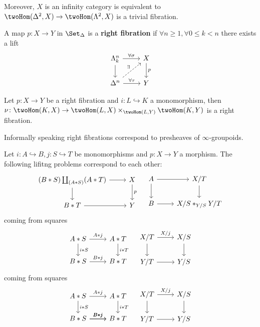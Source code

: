 Moreover, $ X $ is an infinity category is equivalent to $ \twoHom ( \Delta^2 , X ) \to \twoHom ( \Lambda^2 , X ) $ is a trivial fibration.


\begin{defi}
	A map $ p \colon X \to Y $ in $ \Set_\Delta$ is a \textbf{right fibration} if
	$ \forall n \geq 1 , \forall 0 \leq k < n $ there exists a lift
	\[
	\begin{tikzcd}
		\Lambda_k^n 
		\ar[r, " \forall \sigma "]
		\ar[d]
		&
		X
		\ar[d, "p"]
		\\
		\Delta^n
		\ar[ru, dashed, "\exists"]
		\ar[r, "\forall \tau"]
		&
		Y
	\end{tikzcd}
	\]
\end{defi}

\begin{prop}
	Let $ p \colon X \to Y $ be a right fibration and $ i \colon L \hookrightarrow K $ a monomorphism, then $ \nu \colon \twoHom ( K , X ) \to \twoHom ( L , X ) \times_{ \twoHom ( L , Y ) } \twoHom( K , Y ) $ is a right fibration.
\end{prop}

Informally speaking right fibrations correspond to presheaves of $ \infty $-groupoids.

\begin{prop}
	Let $ i \colon A \hookrightarrow B , j \colon S \hookrightarrow T $ be monomorphisms and $ p \colon X \to Y $ a morphism.
	The following lifitng problems correspond to each other:
	\[
	\begin{tikzcd}
		( B * S ) \coprod_{ ( A * S ) } ( A * T )
		\ar[r]
		\ar[d]
		&
		X
		\ar[d, "p "]
		\\
		B * T 
		\ar[r]
		&
		Y
	\end{tikzcd}
	\quad 
	\begin{tikzcd}
		A 
		\ar[r]
		\ar[d]
		&
		X / T
		\ar[d]
		\\
		B
		\ar[r]
		&
		X / S *_{ Y / S } Y / T
	\end{tikzcd}
	\]
	coming from squares 
	\[
	\begin{tikzcd}
		A * S 
		\ar[r, "A * j"]
		\ar[d, "i * S"]
		&
		A*T 
		\ar[d, "i * T"]
		\\
		B * S 
		\ar[r, " B * j "]
		&
		B*T
	\end{tikzcd}
	\quad 
	\begin{tikzcd}
		X / T 
		\ar[ r , " X / j " ]
		\ar[ d ]
		&
		X / S
		\ar[ d ]
		\\
		Y / T
		\ar[r]
		&
		Y / S
	\end{tikzcd}
	\]
	coming from squares
	\[
	\begin{tikzcd}
		A * S 
		\ar[r, " A * j "]
		\ar[d, " i * S "]
		&
		A*T
		\ar[d, " i * T "]
		\\
		B * S \ar[r, " B * j " ]
		\ar[r, " B * j "]
		&
		B * T
	\end{tikzcd}
	\quad
	\begin{tikzcd}
		X / T 
		\ar[ r , " X / j "]
		\ar[d]
		&
		X / S
		\ar[d]
		\\
		Y / T 
		\ar[r]
		&
		Y / S
	\end{tikzcd}
	\]
\end{prop}

